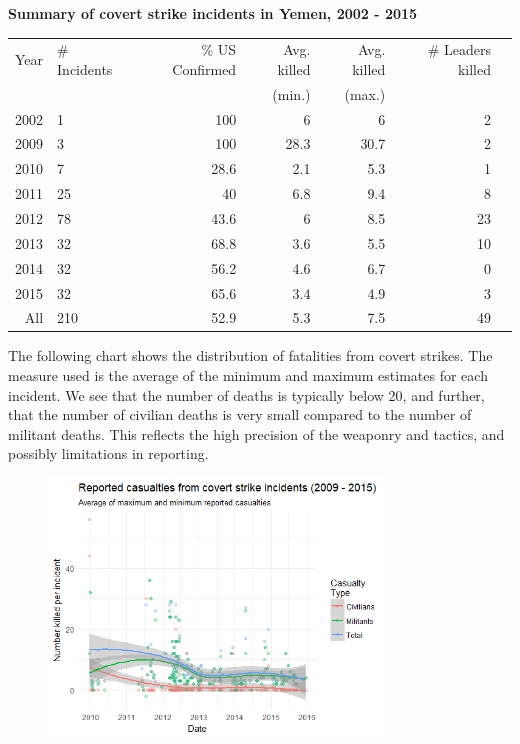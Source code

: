 \documentclass[letterpaper,12pt]{article}
\theoremstyle{definition}
\begin{document}
\noindent\textbf{Summary of covert strike incidents in Yemen, 2002 - 2015}\\
\begin{table}[ht!]
\centering
\begin{tabular}{rlrrrrr}
  \hline
Year & \# Incidents & \% US Confirmed & Avg. killed & Avg. killed & \# Leaders killed \\ 
& & & (min.) & (max.) &\\
  \hline
2002 &   1 & 100 & 6 & 6 & 2 \\ 
2009 &   3 & 100 & 28.3 & 30.7 & 2 \\ 
2010 &   7 & 28.6 & 2.1 & 5.3 & 1 \\ 
2011 &  25 & 40 & 6.8 & 9.4 & 8\\ 
2012 &  78 & 43.6 & 6 & 8.5 & 23 \\ 
2013 &  32 & 68.8 & 3.6 & 5.5 & 10 \\ 
2014 &  32 & 56.2 & 4.6 & 6.7 & 0 \\ 
2015 &  32 & 65.6 & 3.4 & 4.9 & 3 \\ 
  \hline
All & 210 & 52.9 & 5.3 & 7.5 & 49 \\ 
   \hline
\end{tabular}
\end{table}

The following chart shows the distribution of fatalities from covert strikes. The measure used is the average of the minimum and maximum estimates for each incident. We see that the number of deaths is typically below 20, and further, that the number of civilian deaths is very small compared to the number of militant deaths. This reflects the high precision of the weaponry and tactics, and possibly limitations in reporting.

\begin{figure}[htb!]
  \includegraphics[width=3.5in]{strike_killed.png}
\end{figure}
\end{document}
